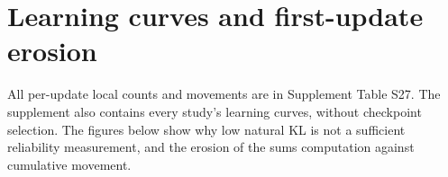 \clearpage
\section{Learning curves and first-update erosion}\label{app:curves}

All per-update local counts and movements are in Supplement Table S27.
The supplement also contains every study's learning curves, without checkpoint
selection. The figures below show why low natural KL is not a sufficient reliability
measurement, and the erosion of the sums computation against cumulative
movement.



